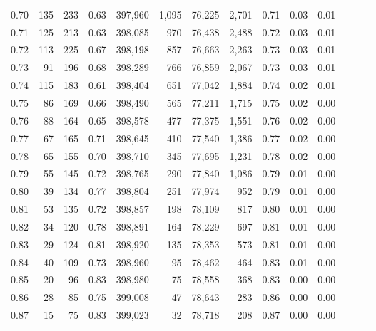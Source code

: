 \begin{tabular}{rrrrrrrrrrrrrr}
0.70 &     135 &    233 &  0.63 &  397,960 &    1,095 &  76,225 &   2,701 &  0.71 &  0.03 &      0.01 \\
0.71 &     125 &    213 &  0.63 &  398,085 &      970 &  76,438 &   2,488 &  0.72 &  0.03 &      0.01 \\
0.72 &     113 &    225 &  0.67 &  398,198 &      857 &  76,663 &   2,263 &  0.73 &  0.03 &      0.01 \\
0.73 &      91 &    196 &  0.68 &  398,289 &      766 &  76,859 &   2,067 &  0.73 &  0.03 &      0.01 \\
0.74 &     115 &    183 &  0.61 &  398,404 &      651 &  77,042 &   1,884 &  0.74 &  0.02 &      0.01 \\
0.75 &      86 &    169 &  0.66 &  398,490 &      565 &  77,211 &   1,715 &  0.75 &  0.02 &      0.00 \\
0.76 &      88 &    164 &  0.65 &  398,578 &      477 &  77,375 &   1,551 &  0.76 &  0.02 &      0.00 \\
0.77 &      67 &    165 &  0.71 &  398,645 &      410 &  77,540 &   1,386 &  0.77 &  0.02 &      0.00 \\
0.78 &      65 &    155 &  0.70 &  398,710 &      345 &  77,695 &   1,231 &  0.78 &  0.02 &      0.00 \\
0.79 &      55 &    145 &  0.72 &  398,765 &      290 &  77,840 &   1,086 &  0.79 &  0.01 &      0.00 \\
0.80 &      39 &    134 &  0.77 &  398,804 &      251 &  77,974 &     952 &  0.79 &  0.01 &      0.00 \\
0.81 &      53 &    135 &  0.72 &  398,857 &      198 &  78,109 &     817 &  0.80 &  0.01 &      0.00 \\
0.82 &      34 &    120 &  0.78 &  398,891 &      164 &  78,229 &     697 &  0.81 &  0.01 &      0.00 \\
0.83 &      29 &    124 &  0.81 &  398,920 &      135 &  78,353 &     573 &  0.81 &  0.01 &      0.00 \\
0.84 &      40 &    109 &  0.73 &  398,960 &       95 &  78,462 &     464 &  0.83 &  0.01 &      0.00 \\
0.85 &      20 &     96 &  0.83 &  398,980 &       75 &  78,558 &     368 &  0.83 &  0.00 &      0.00 \\
0.86 &      28 &     85 &  0.75 &  399,008 &       47 &  78,643 &     283 &  0.86 &  0.00 &      0.00 \\
0.87 &      15 &     75 &  0.83 &  399,023 &       32 &  78,718 &     208 &  0.87 &  0.00 &      0.00 \\

\end{tabular}
